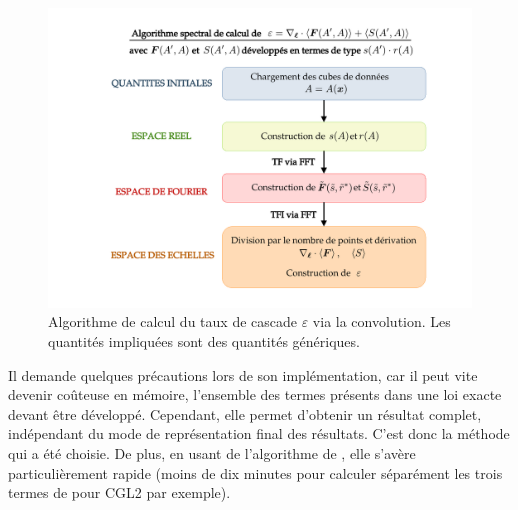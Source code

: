  \begin{figure}[!ht]
  \centering
 \includegraphics[width=0.93\linewidth,trim=4cm 1cm 3cm 1cm, clip=true]{./Mainmatter/Part_3/images_ch1/code_EL_spec}
 \cprotect\caption{Algorithme de calcul du taux de cascade \ensuremath{\varepsilon} via la convolution. Les quantités impliquées sont des quantités génériques.}
 \label{fig:algo_spec}
 \end{figure}
 Il demande quelques précautions lors de son implémentation, car il peut vite devenir coûteuse en mémoire, l'ensemble des termes présents dans une loi exacte devant être développé. Cependant, elle permet d'obtenir un résultat complet, indépendant du mode de représentation final des résultats. C'est donc la méthode qui a été choisie. De plus, en usant de l'algorithme de , elle s'avère particulièrement rapide (moins de dix minutes pour calculer séparément les trois termes de  pour CGL2 par exemple).
 
